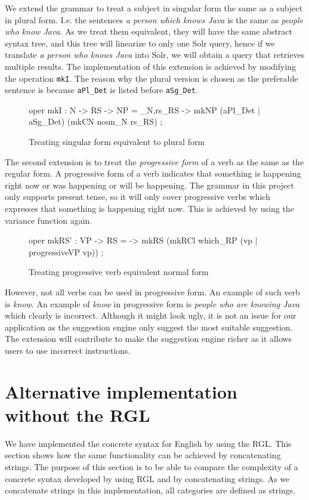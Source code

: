 We extend the grammar to treat a subject in singular form the same as a subject in plural form. I.e. the sentences \emph{a person which knows Java} is the same as \emph{people who know Java}. As we treat them equivalent, they will have the same abstract syntax tree, and this tree will linearize to only one Solr query, hence if we translate \emph{a person who knows Java} into Solr, we will obtain a query that retrieves multiple results. The implementation of this extension is achieved by modifying the operation \texttt{mkI}. The reason why the plural version is chosen as the preferable sentence is because \texttt{aPl\_Det} is listed before \texttt{aSg\_Det}.

\begin{figure}[H]
\begin{code}
oper
  mkI : N -> RS -> NP = \noun_N,rs_RS -> mkNP (aPl_Det | aSg_Det)
                             (mkCN noun_N rs_RS) ;
\end{code}
\caption{Treating singular form equivalent to plural form\label{fig:linearize-using-list}}
\end{figure}

The second extension is to treat the \emph{progressive form} of a verb as the same as the regular form. A progressive form of a verb indicates that something is happening right now or was happening or will be happening. The grammar in this project only supports present tense, so it will only cover progressive verbs which expresses that something is happening right now. This is achieved by using the variance function again.

\begin{figure}[H]
\begin{code}
oper
  mkRS' : VP -> RS = \vp -> mkRS (mkRCl which_RP (vp | progressiveVP vp)) ;
\end{code}
\caption{Treating progressive verb equivalent normal form\label{fig:linearize-using-list}}
\end{figure}

However, not all verbs can be used in progressive form. An example of such verb is \emph{know}. An example of  \emph{know} in progressive form is \emph{people who are knowing Java} which clearly is incorrect. Although it might look ugly, it is not an issue for our application as the suggestion engine only suggest the most suitable suggestion. The extension will contribute to make the suggestion engine richer as it allows users to use incorrect instructions.

\section{Alternative implementation without the RGL}\label{sec:english-concat}
We have implemented the concrete syntax for English by using the RGL. This section shows how the same functionality can be achieved by concatenating strings. The purpose of this section is to be able to compare the complexity of a concrete syntax developed by using RGL and by concatenating strings.\newline
\newline
As we concatenate strings in this implementation, all categories are defined as strings.

